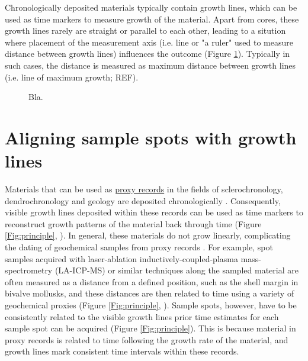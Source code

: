 \documentclass[11pt, a4paper]{article}
\begin{document}
Chronologically deposited materials typically contain growth lines, which can be used as time markers to measure growth of the material. Apart from cores, these growth lines rarely are straight or parallel to each other, leading to a sitution where placement of the measurement axis (i.e. line or "a ruler" used to measure distance between growth lines) influences the outcome (Figure \ref{Fig:growthlines}). Typically in such cases, the distance is measured as maximum distance between growth lines (i.e. line of maximum growth; REF).

\begin{figure}[ht]
\caption{Bla.}
\label{Fig:growthlines}
\end{figure}


\clearpage
\section{Aligning sample spots with growth lines} \label{sec:align}

Materials that can be used as \href{http://en.wikipedia.org/wiki/Proxy_(climate)}{proxy records} in the fields of sclerochronology, dendrochronology and geology are deposited chronologically \citep{Masson-Delmotte2013}. Consequently, visible growth lines deposited within these records can be used as time markers to reconstruct growth patterns of the material back through time (Figure \ref{Fig:principle}, \citealp{Proctor2000,Sejr2002,Schone2005a,Ambrose2012}). In general, these materials do not grow linearly, complicating the dating of geochemical samples from proxy records \citep{Schone2008,Ambrose2012}. For example, spot samples acquired with laser-ablation inductively-coupled-plasma mass-spectrometry (LA-ICP-MS) or similar techniques along the sampled material are often measured as a distance from a defined position, such as the shell margin in bivalve mollusks, and these distances are then related to time using a variety of geochemical proxies (Figure \ref{Fig:principle}, \citealp{Vihtakari2014}). Sample spots, however, have to be consistently related to the visible growth lines prior time estimates for each sample spot can be acquired (Figure \ref{Fig:principle}). This is because material in proxy records is related to time following the growth rate of the material, and growth lines mark consistent time intervals within these records.
\end{document}
